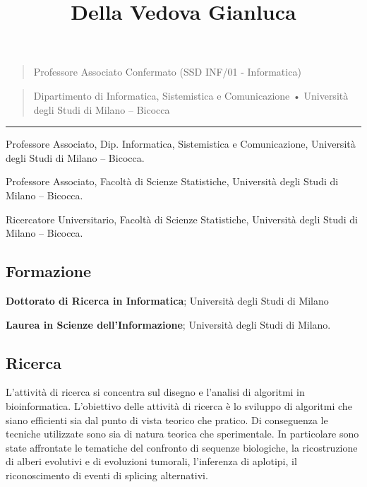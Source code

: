 \documentclass[
]{article}
\title{Della Vedova Gianluca}
\author{}
\date{}
\providecommand{\tightlist}{%
  \setlength{\itemsep}{0pt}\setlength{\parskip}{0pt}}
\begin{document}
\maketitle

\begin{quote}
Professore Associato Confermato (SSD INF/01 - Informatica)
\end{quote}

\begin{quote}
Dipartimento di Informatica, Sistemistica e Comunicazione • Università
degli Studi di Milano -- Bicocca
\end{quote}

\begin{center}\rule{0.5\linewidth}{0.5pt}\end{center}

\begin{description}
\tightlist
\item[10/2012-oggi]
Professore Associato, Dip. Informatica, Sistemistica e Comunicazione,
Università degli Studi di Milano -- Bicocca.
\item[10/2005-09/2012]
Professore Associato, Facoltà di Scienze Statistiche, Università degli
Studi di Milano -- Bicocca.
\item[05/2001-09/2005]
Ricercatore Universitario, Facoltà di Scienze Statistiche, Università
degli Studi di Milano -- Bicocca.
\end{description}

\hypertarget{formazione}{%
\subsection{Formazione}\label{formazione}}

\begin{description}
\tightlist
\item[2001]
\textbf{Dottorato di Ricerca in Informatica}; Università degli Studi di
Milano
\item[1995]
\textbf{Laurea in Scienze dell'Informazione}; Università degli Studi di
Milano.
\end{description}

\hypertarget{ricerca}{%
\subsection{Ricerca}\label{ricerca}}

L'attività di ricerca si concentra sul disegno e l'analisi di algoritmi
in bioinformatica. L'obiettivo delle attività di ricerca è lo sviluppo
di algoritmi che siano efficienti sia dal punto di vista teorico che
pratico. Di conseguenza le tecniche utilizzate sono sia di natura
teorica che sperimentale. In particolare sono state affrontate le
tematiche del confronto di sequenze biologiche, la ricostruzione di
alberi evolutivi e di evoluzioni tumorali, l'inferenza di aplotipi, il
riconoscimento di eventi di splicing alternativi.
\end{document}
